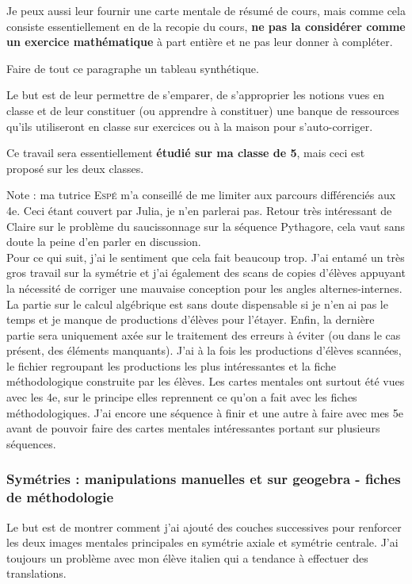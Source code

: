 Je peux aussi leur fournir une carte mentale de résumé de cours, mais comme cela consiste essentiellement en de la recopie du cours, \textbf{ne pas la considérer comme un exercice mathématique} à part entière et ne pas leur donner à compléter.

{\color{red}Faire de tout ce paragraphe un tableau synthétique.}

Le but est de leur permettre de s'emparer, de s'approprier les notions vues en classe et de leur constituer {\color{red}(ou apprendre à constituer)} une banque de ressources qu'ils utiliseront en classe sur exercices ou à la maison pour s'auto-corriger.

Ce travail sera essentiellement \textbf{étudié sur ma classe de 5}, mais ceci est proposé sur les deux classes.

Note : ma tutrice \textsc{Espé} m'a conseillé de me limiter aux parcours différenciés aux 4e. Ceci étant couvert par Julia, je n'en parlerai pas. {\color{red}Retour très intéressant de Claire sur le problème du saucissonnage sur la séquence Pythagore, cela vaut sans doute la peine d'en parler en discussion.}\\

{\color{red} Pour ce qui suit, j'ai le sentiment que cela fait beaucoup trop. J'ai entamé un très gros travail sur la symétrie et j'ai également des scans de copies d'élèves appuyant la nécessité de corriger une mauvaise conception pour les angles alternes-internes. La partie sur le calcul algébrique est sans doute dispensable si je n'en ai pas le temps et je manque de productions d'élèves pour l'étayer. Enfin, la dernière partie sera uniquement axée sur le traitement des erreurs à éviter (ou dans le cas présent, des éléments manquants). J'ai à la fois les productions d'élèves scannées, le fichier regroupant les productions les plus intéressantes et la fiche méthodologique construite par les élèves. Les cartes mentales ont surtout été vues avec les 4e, sur le principe elles reprennent ce qu'on a fait avec les fiches méthodologiques. J'ai encore une séquence à finir et une autre à faire avec mes 5e avant de pouvoir faire des cartes mentales intéressantes portant sur plusieurs séquences.}

\subsubsection{Symétries : manipulations manuelles et sur geogebra - fiches de méthodologie}

Le but est de montrer comment j'ai ajouté des couches successives pour renforcer les deux images mentales principales en symétrie axiale et symétrie centrale. J'ai toujours un problème avec mon élève italien qui a tendance à effectuer des translations.

